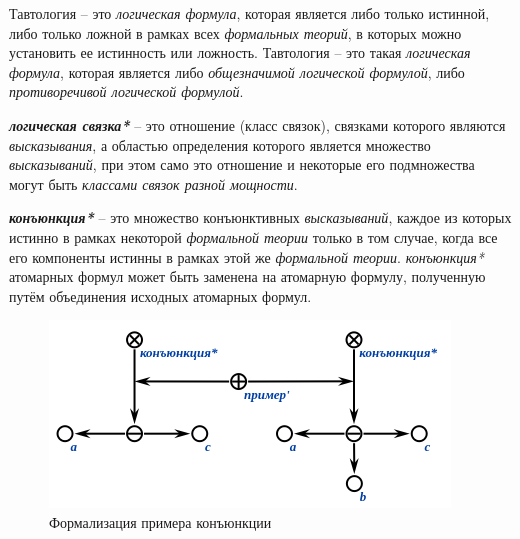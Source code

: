 Тавтология -- это \textit{логическая формула}, которая является либо только истинной, либо только ложной в рамках всех \textit{формальных теорий}, в которых можно установить ее истинность или ложность.
Тавтология -- это такая \textit{логическая формула}, которая является либо \textit{общезначимой логической формулой}, либо \textit{противоречивой логической формулой}.

\begin{SCn}
\end{SCn}

\textbf{\textit{логическая связка*}} -- это отношение (класс связок), связками которого являются \textit{высказывания}, а областью определения которого является множество \textit{высказываний}, при этом само это отношение и некоторые его подмножества могут быть \textit{классами связок разной мощности}.

\begin{SCn}
\end{SCn}

\textbf{\textit{конъюнкция*}} -- это множество конъюнктивных \textit{высказываний}, каждое из которых истинно в рамках некоторой \textit{формальной теории} только в том случае, когда все его компоненты истинны в рамках этой же \textit{формальной теории}. \textit{конъюнкция*} атомарных формул может быть заменена на атомарную формулу, полученную путём объединения исходных атомарных формул.

\begin{figure}[http]
	\includegraphics[scale=0.8]{author/part2/figures/logic/conjunction.png}
	\caption{Формализация примера конъюнкции}
	\label{fig:conjunction}
\end{figure}

